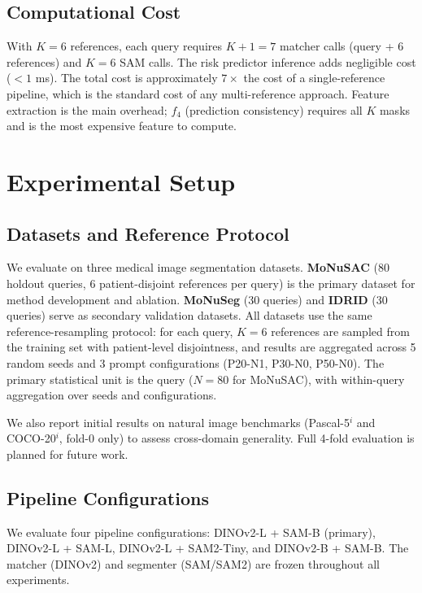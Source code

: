\documentclass[11pt]{article}
\begin{document}
\subsection{Computational Cost}

With $K=6$ references, each query requires $K+1 = 7$ matcher calls (query +
6 references) and $K = 6$ SAM calls. The risk predictor inference adds
negligible cost ($<1$ ms). The total cost is approximately $7\times$ the
cost of a single-reference pipeline, which is the standard cost of any
multi-reference approach. Feature extraction is the main overhead; $f_4$
(prediction consistency) requires all $K$ masks and is the most expensive
feature to compute.

\section{Experimental Setup}

\subsection{Datasets and Reference Protocol}

We evaluate on three medical image segmentation datasets. \textbf{MoNuSAC}
(80 holdout queries, 6 patient-disjoint references per query) is the primary
dataset for method development and ablation. \textbf{MoNuSeg} (30 queries)
and \textbf{IDRID} (30 queries) serve as secondary validation datasets. All
datasets use the same reference-resampling protocol: for each query, $K=6$
references are sampled from the training set with patient-level
disjointness, and results are aggregated across 5 random seeds and 3 prompt
configurations (P20-N1, P30-N0, P50-N0). The primary statistical unit is the
query ($N=80$ for MoNuSAC), with within-query aggregation over seeds and
configurations.

We also report initial results on natural image benchmarks
(Pascal-5$^i$ and COCO-20$^i$, fold-0 only) to assess cross-domain
generality. Full 4-fold evaluation is planned for future work.

\subsection{Pipeline Configurations}

We evaluate four pipeline configurations: DINOv2-L + SAM-B (primary),
DINOv2-L + SAM-L, DINOv2-L + SAM2-Tiny, and DINOv2-B + SAM-B. The matcher
(DINOv2) and segmenter (SAM/SAM2) are frozen throughout all experiments.
\end{document}
